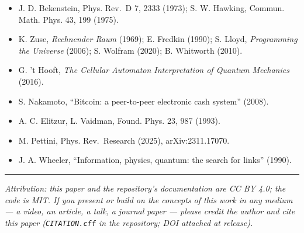 \documentclass[
  11pt,
]{article}
\begin{document}
\begin{itemize}
  (1975).
\item
  J. D. Bekenstein, Phys. Rev.~D 7, 2333 (1973); S. W. Hawking, Commun.
  Math. Phys. 43, 199 (1975).
\item
  K. Zuse, \emph{Rechnender Raum} (1969); E. Fredkin (1990); S. Lloyd,
  \emph{Programming the Universe} (2006); S. Wolfram (2020); B.
  Whitworth (2010).
\item
  G. 't Hooft, \emph{The Cellular Automaton Interpretation of Quantum
  Mechanics} (2016).
\item
  S. Nakamoto, ``Bitcoin: a peer-to-peer electronic cash system''
  (2008).
\item
  A. C. Elitzur, L. Vaidman, Found. Phys. 23, 987 (1993).
\item
  M. Pettini, Phys. Rev.~Research (2025), arXiv:2311.17070.
\item
  J. A. Wheeler, ``Information, physics, quantum: the search for links''
  (1990).
\end{itemize}

\begin{center}\rule{0.5\linewidth}{0.5pt}\end{center}

\emph{Attribution: this paper and the repository's documentation are CC
BY 4.0; the code is MIT. If you present or build on the concepts of this
work in any medium --- a video, an article, a talk, a journal paper ---
please credit the author and cite this paper (\texttt{CITATION.cff} in
the repository; DOI attached at release).}
\end{document}
